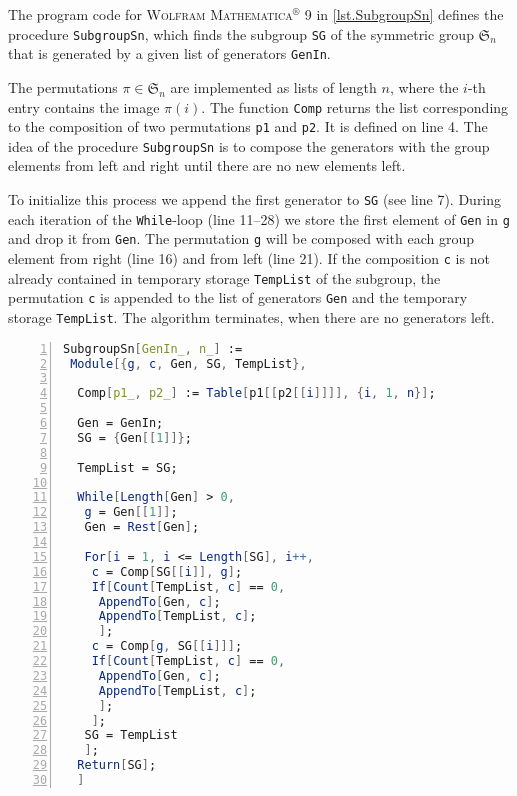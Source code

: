 The program code for \textsc{Wolfram Mathematica$^\circledR$ 9} in \cref{lst.SubgroupSn} defines the procedure \verb+SubgroupSn+, which finds the subgroup \verb+SG+ of the symmetric group $\mathfrak{S}_n$ that is generated by a given list of generators \verb+GenIn+.

The permutations $\pi\in\mathfrak{S}_n$ are implemented as lists of length $n$, where the $i$-th entry contains the image $\pi(i)$. The function \verb+Comp+ returns the list corresponding to the composition of two permutations \verb+p1+ and \verb+p2+. It is defined on line 4. The idea of the procedure \verb+SubgroupSn+ is to compose the generators with the group elements from left and right until there are no new elements left.

To initialize this process we append the first generator to \verb+SG+ (see line 7). During each iteration of the \verb+While+-loop (line 11--28) we store the first element of \verb+Gen+ in \verb+g+ and drop it from \verb+Gen+. The permutation \verb+g+ will be composed with each group element from right (line 16) and from left (line 21). If the composition \verb+c+ is not already contained in temporary storage \verb+TempList+ of the subgroup, the permutation \verb+c+ is appended to the list of generators \verb+Gen+ and the temporary storage \verb+TempList+. The algorithm terminates, when there are no generators left.

\begin{lstlisting}[float, caption=Finding a subgroup of $\mathfrak S_n$,
                   label=lst.SubgroupSn,
                   language=Mathematica, 
                   numbers=left,
                   numberstyle=\tiny,
                   stepnumber=2,
                   numbersep=5pt]
SubgroupSn[GenIn_, n_] :=
 Module[{g, c, Gen, SG, TempList},
  
  Comp[p1_, p2_] := Table[p1[[p2[[i]]]], {i, 1, n}];
  
  Gen = GenIn;
  SG = {Gen[[1]]};
  
  TempList = SG;
  
  While[Length[Gen] > 0,
   g = Gen[[1]];
   Gen = Rest[Gen];
   
   For[i = 1, i <= Length[SG], i++,
    c = Comp[SG[[i]], g];
    If[Count[TempList, c] == 0,
     AppendTo[Gen, c];
     AppendTo[TempList, c];
     ];
    c = Comp[g, SG[[i]]];
    If[Count[TempList, c] == 0,
     AppendTo[Gen, c];
     AppendTo[TempList, c];
     ];
    ];
   SG = TempList
   ];
  Return[SG];
  ]
\end{lstlisting}

